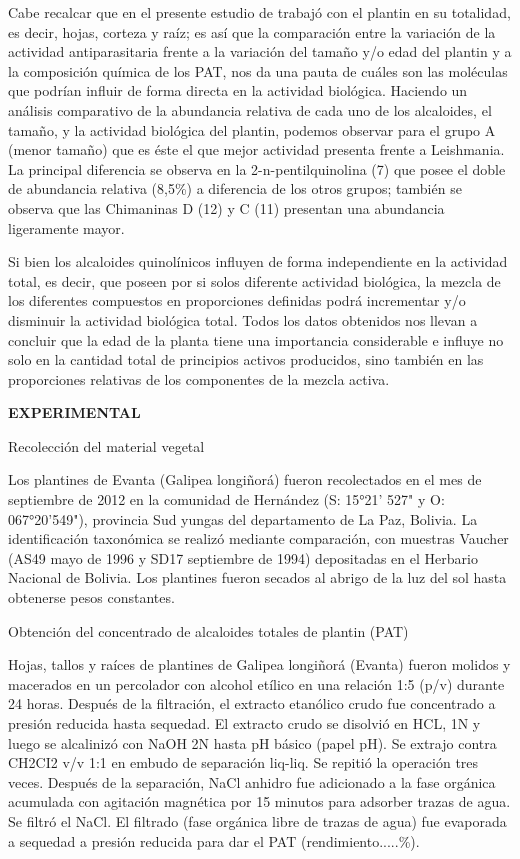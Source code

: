 \documentclass{article}
\begin{document}
Cabe recalcar que en el presente estudio de trabajó con el plantin en su
totalidad, es decir, hojas, corteza y raíz; es así que la comparación entre la
variación de la actividad antiparasitaria frente a la variación del tamaño y/o
edad del plantin y a la composición química de los PAT, nos da una pauta de
cuáles son las moléculas que podrían influir de forma directa en la actividad
biológica. Haciendo un análisis comparativo de la abundancia relativa de cada
uno de los alcaloides, el tamaño, y la actividad biológica del plantin, podemos
observar para el grupo A (menor tamaño) que es éste el que mejor actividad
presenta frente a Leishmania. La principal diferencia se observa en la
2-n-pentilquinolina (7) que posee el doble de abundancia relativa (8,5\%) a
diferencia de los otros grupos; también se observa que las Chimaninas D (12) y C
(11) presentan una abundancia ligeramente mayor.

Si bien los alcaloides quinolínicos influyen de forma independiente en la
actividad total, es decir, que poseen por si solos diferente actividad
biológica, la mezcla de los diferentes compuestos en proporciones definidas
podrá incrementar y/o disminuir la actividad biológica total. Todos los datos
obtenidos nos llevan a concluir que la edad de la planta tiene una importancia
considerable e influye no solo en la cantidad total de principios activos
producidos, sino también en las proporciones relativas de los componentes de la
mezcla activa.

\textbf{EXPERIMENTAL}

Recolección del material vegetal

Los plantines de Evanta (Galipea longiñorá) fueron recolectados en el mes de
septiembre de 2012 en la comunidad de Hernández (S: 15°21' 527" y O:
067°20'549"), provincia Sud yungas del departamento de La Paz, Bolivia. La
identificación taxonómica se realizó mediante comparación, con muestras Vaucher
(AS49 mayo de 1996 y SD17 septiembre de 1994) depositadas en el Herbario
Nacional de Bolivia. Los plantines fueron secados al abrigo de la luz del sol
hasta obtenerse pesos constantes.

Obtención del concentrado de alcaloides totales de plantin (PAT)

Hojas, tallos y raíces de plantines de Galipea longiñorá (Evanta) fueron molidos
y macerados en un percolador con alcohol etílico en una relación 1:5 (p/v)
durante 24 horas. Después de la filtración, el extracto etanólico crudo fue
concentrado a presión reducida hasta sequedad. El extracto crudo se disolvió en
HCL, 1N y luego se alcalinizó con NaOH 2N hasta pH básico (papel pH). Se extrajo
contra CH2CI2 v/v 1:1 en embudo de separación liq-liq. Se repitió la operación
tres veces. Después de la separación, NaCl anhidro fue adicionado a la fase
orgánica acumulada con agitación magnética por 15 minutos para adsorber trazas
de agua. Se filtró el NaCl. El filtrado (fase orgánica libre de trazas de agua)
fue evaporada a sequedad a presión reducida para dar el PAT
(rendimiento.....\%).
\end{document}
